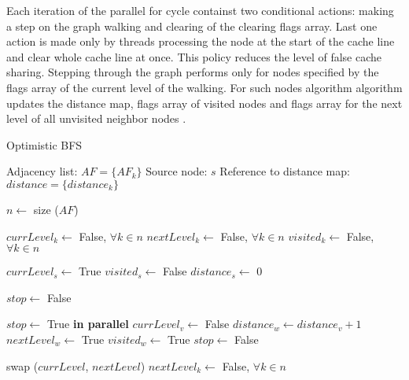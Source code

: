 \documentclass[letterpaper]{article}
\begin{document}
			Each iteration of the parallel for cycle containst two conditional actions: making a step on the graph walking and clearing of the clearing flags array.
			Last one action is made only by threads processing the node at the start of the cache line and clear whole cache line at once.
			This policy reduces the level of false cache sharing. 
			Stepping through the graph performs only for nodes specified by the flags array of the current level of the walking.
			For such nodes algorithm algorithm updates the distance map, flags array of visited nodes and flags array for the next level of all unvisited neighbor nodes .
						
			\begin{algorithm}
				\caption{Optimistic BFS}
				\label{alg:optbfs}
				\begin{algorithmic}[1]
					\Require
						\Statex Adjacency list: $AF = \lbrace AF_k \rbrace$
						\Statex Source node: $s$
						\Statex Reference to distance map: $distance = \lbrace distance_k \rbrace$
					\Statex

					\State $n \gets$ size ($AF$) 					
					
					\State $currLevel_k \gets$ False, $\forall k \in n$
					\State $nextLevel_k \gets$ False, $\forall k \in n$
					\State $visited_k \gets$ False, $\forall k \in n$
					\Statex
					
					\State $currLevel_s \gets$ True
					\State $visited_s \gets$ False
					\State $distance_s \gets$ 0
					\Statex
					
					\State $stop \gets$ False
					\Statex
					
						\State $stop\gets$ True
						 \textbf{in parallel}
								\State $currLevel_v \gets$ False
										\State $distance_w \gets distance_v + 1$
										\State $nextLevel_w \gets$ True
										\State $visited_w \gets$ True
										\State $stop \gets$ False
									\EndIf
								\EndFor
							\EndIf
						\EndFor
						
						\vspace{-0.051cm} %
						
						\State swap ($currLevel$, $nextLevel$)
						\State $nextLevel_k \gets$ False, $\forall k\in n$
					\EndWhile
				\end{algorithmic}
			\end{algorithm}
\end{document}
